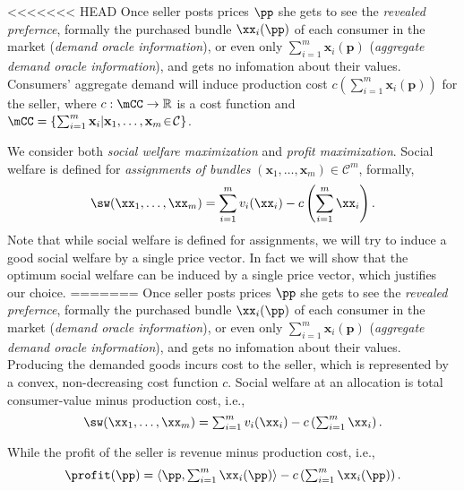 <<<<<<< HEAD
Once seller posts prices $\pp$ she gets to see the \emph{revealed prefernce}, formally the purchased bundle $\xx_i(\pp)$ of each consumer in the market (\emph{demand oracle information}), or even only $\sum_{i=1}^{m}\mathbf{x}_i(\mathbf{p})$ (\emph{aggregate demand oracle information}), and gets no infomation about their values.
Consumers' aggregate demand will induce production cost $c(\sum_{i=1}^{m}\mathbf{x}_i(\mathbf{p}))$ for the seller, where $c:\mCC\to \mathbb{R}$ is a cost function and $\mCC =\{\sum_{i=1}^{m}\mathbf{x}_i|\mathbf{x}_1,\ldots,\mathbf{x}_m\!\in\!\mathcal{C}\}$.

We consider both \emph{social welfare maximization} and \emph{profit maximization}. Social welfare is defined for \emph{assignments of bundles} $(\mathbf{x}_1,\ldots,\mathbf{x}_m)\in \mathcal{C}^m$, formally,
\begin{equation}\label{socWelf}
    \sw(\xx_1,\ldots,\xx_m)=\sum_{i=1}^{m}v_i(\xx_i)-c\left(\sum_{i=1}^{m}\xx_i\right).
\end{equation}
Note that while social welfare is defined for assignments, we will try to induce a good social welfare by a single price vector. In fact we will show that the optimum social welfare can be induced by a single price vector, which justifies our choice.
=======
Once seller posts prices $\pp$ she gets to see the \emph{revealed prefernce}, formally the purchased bundle $\xx_i(\pp)$ of each consumer in the market (\emph{demand oracle information}), or even only $\sum_{i=1}^{m}\mathbf{x}_i(\mathbf{p})$ (\emph{aggregate demand oracle information}), and gets no infomation about their values. Producing the demanded goods incurs cost to the seller, which is represented by a convex, non-decreasing cost function $c$. %
Social welfare at an allocation is total consumer-value minus production cost, i.e., %
    \begin{equation}\label{socWelf}
        \sw(\xx_1,\ldots,\xx_m)=\textstyle\sum_{i=1}^{m}v_i(\xx_i)-c\left(\textstyle\sum_{i=1}^{m}\xx_i\right).
    \end{equation}

While the profit of the seller is revenue minus production cost, i.e., %
    \begin{equation}\label{eq:profit}
    \profit(\pp) = \langle \pp, \textstyle\sum_{i=1}^m \xx_i(\pp)\rangle - c\left(\textstyle\sum_{i=1}^m \xx_i(\pp)\right).
    \end{equation}

